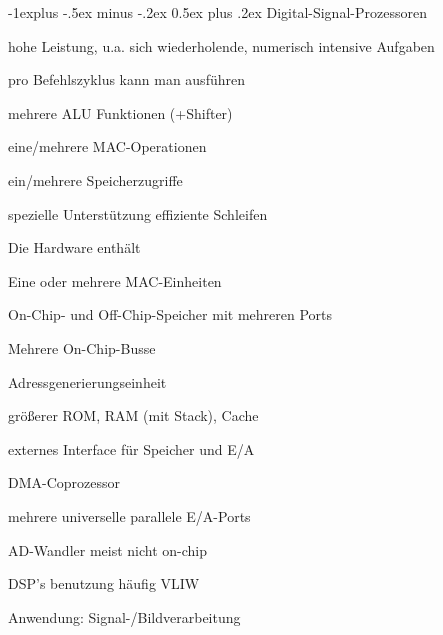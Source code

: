 \documentclass[10pt,landscape]{article}
\makeatletter
\renewcommand{\subsection}{\@startsection{subsection}{2}{0mm}%
                                {-1explus -.5ex minus -.2ex}%
                                {0.5ex plus .2ex}%
                                {\normalfont\normalsize\bfseries}}
\makeatother
\begin{document}
\begin{multicols}{3}
  \subsection{Digital-Signal-Prozessoren}
  \begin{itemize*}
    \item hohe Leistung, u.a. sich wiederholende, numerisch intensive Aufgaben
    \item pro Befehlszyklus kann man ausführen
    \begin{itemize*}
      \item mehrere ALU Funktionen (+Shifter)
      \item eine/mehrere MAC-Operationen
      \item ein/mehrere Speicherzugriffe
      \item spezielle Unterstützung effiziente Schleifen
    \end{itemize*}
    \item Die Hardware enthält
    \begin{itemize*}
      \item Eine oder mehrere MAC-Einheiten
      \item On-Chip- und Off-Chip-Speicher mit mehreren Ports
      \item Mehrere On-Chip-Busse
      \item Adressgenerierungseinheit
      \item größerer ROM, RAM (mit Stack), Cache
      \item externes Interface für Speicher und E/A
      \item DMA-Coprozessor
      \item mehrere universelle parallele E/A-Ports
      \item AD-Wandler meist nicht on-chip
    \end{itemize*}
    \item DSP's benutzung häufig VLIW
    \item Anwendung: Signal-/Bildverarbeitung
  \end{itemize*}
  

\end{multicols}
\end{document}
